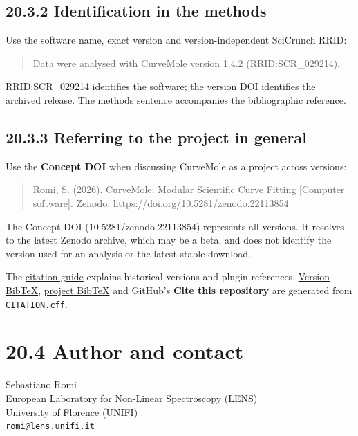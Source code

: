 \documentclass[
  10pt,
  a4paper,
  oneside]{scrreprt}
\begin{document}
\hypertarget{identification-in-the-methods}{%
\subsection{20.3.2 Identification in the
methods}\label{identification-in-the-methods}}

Use the software name, exact version and version-independent SciCrunch
RRID:

\begin{quote}
Data were analysed with CurveMole version 1.4.2 (RRID:SCR\_029214).
\end{quote}

\href{https://scicrunch.org/resolver/RRID:SCR_029214}{RRID:SCR\_029214}
identifies the software; the version DOI identifies the archived
release. The methods sentence accompanies the bibliographic reference.

\hypertarget{referring-to-the-project-in-general}{%
\subsection{20.3.3 Referring to the project in
general}\label{referring-to-the-project-in-general}}

Use the \textbf{Concept DOI} when discussing CurveMole as a project
across versions:

\begin{quote}
Romi, S. (2026). CurveMole: Modular Scientific Curve Fitting {[}Computer
software{]}. Zenodo. https://doi.org/10.5281/zenodo.22113854
\end{quote}

The Concept DOI (10.5281/zenodo.22113854) represents all versions. It
resolves to the latest Zenodo archive, which may be a beta, and does not
identify the version used for an analysis or the latest stable download.

The \href{citing.md}{citation guide} explains historical versions and
plugin references. \href{citation.bib}{Version BibTeX},
\href{concept-citation.bib}{project BibTeX} and GitHub's \textbf{Cite
this repository} are generated from \texttt{CITATION.cff}.

\hypertarget{author-and-contact}{%
\section{20.4 Author and contact}\label{author-and-contact}}

Sebastiano Romi\\
European Laboratory for Non-Linear Spectroscopy (LENS)\\
University of Florence (UNIFI)\\
\href{mailto:romi@lens.unifi.it}{\nolinkurl{romi@lens.unifi.it}}
\end{document}
